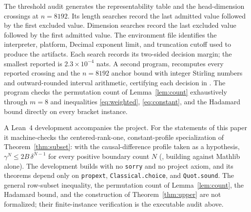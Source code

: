 \documentclass[10pt]{article} %
\theoremstyle{definition}
\begin{document}
The threshold audit generates the representability table and the head-dimension
crossings at \(n=8192\).  Its length searches record the last
admitted value followed by the first excluded value.  Dimension searches
record the last excluded value followed by the first admitted value.  The
environment file identifies the interpreter, platform, Decimal exponent
limit, and truncation cutoff used to produce the artifacts.  Each search
records its two-sided decision margin; the smallest reported is
\(2.3\times10^{-4}\) nats.  A second program,
 recomputes every reported
crossing and the \(n=8192\) anchor bound with integer Stirling numbers
and outward-rounded interval arithmetic, certifying each decision in
.  The program
 checks the permutation
count of Lemma~\ref{lem:count} exhaustively through \(m=8\) and inequalities
\eqref{eq:weighted}, \eqref{eq:constant}, and the Hadamard bound
directly on every bracket instance.

A Lean~4 development accompanies the project.  For the statements of this
paper it machine-checks the centered-rank-one, constant-profile
specialization of Theorem~\ref{thm:subset}: with the causal-difference
profile taken as a hypothesis, \(\gamma^N\le2B\,\delta^{N-1}\) for every
positive boundary count \(N\) (, building against
Mathlib alone).  The development builds with no \texttt{sorry} and no
project axiom, and its theorems depend only on \texttt{propext},
\texttt{Classical.choice}, and \texttt{Quot.sound}.  The general row-subset
inequality, the permutation count of Lemma~\ref{lem:count}, the Hadamard
bound, and the construction of Theorem~\ref{thm:upper} are not
formalized; their finite-instance verification is the executable audit
above.
\end{document}
